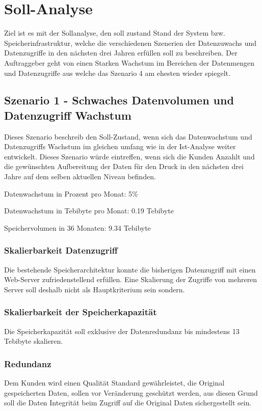 
\cleardoublepage
\chapter{Soll-Analyse}
Ziel ist es mit der Sollanalyse, den soll zustand Stand der System bzw. Speicherinfrastruktur, welche die verschiedenen Szenerien der Datenzuwachs und Datenzugriffe in den nächsten drei Jahren erfüllen soll  zu beschreiben. Der Auftraggeber geht von einen Starken Wachstum im Bereichen der Datenmengen und Datenzugriffe aus welche das Szenario 4 am ehesten wieder spiegelt.


\section{Szenario 1 - Schwaches Datenvolumen und Datenzugriff Wachstum}
Dieses Szenario beschreib den Soll-Zustand, wenn sich das Datenwachstum und Datenzugriffs Wachstum im gleichen umfang wie in der Ist-Analyse weiter entwickelt. Dieses Szenario würde eintreffen, wenn sich die Kunden Anzahlt und die gewünschten Aufbereitung der Daten für den Druck in den nächsten drei Jahre auf dem selben aktuellen Niveau befinden.


Datenwachstum in Prozent pro Monat: 5\% 

Datenwachstum in Tebibyte pro Monat: 0.19 Tebibyte

Speichervolumen in 36 Monaten: 9.34 Tebibyte

\subsection{Skalierbarkeit Datenzugriff}
Die bestehende Speicherarchitektur konnte die bisherigen Datenzugriff mit einen Web-Server zufriedenstellend erfüllen. Eine Skalierung der Zugriffe von mehreren Server soll deshalb nicht als Hauptkriterium sein sondern.

\subsection{Skalierbarkeit der Speicherkapazität}
Die Speicherkapazität soll exklusive der Datenredundanz bis mindestens 13 Tebibyte skalieren.

\subsection{Redundanz}
Dem Kunden wird einen Qualität Standard gewährleistet, die Original gespeicherten Daten, sollen vor Veränderung geschützt werden, aus diesen Grund soll die Daten Integrität beim Zugriff auf die Original Daten sichergestellt sein.



